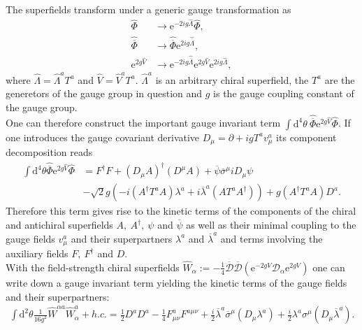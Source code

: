 The superfields transform under a generic gauge transformation as
\begin{align}
\hat{\Phi} &\to \mathrm{e}^{-2ig\hat{\Lambda}}\hat{\Phi},\nonumber\\
\hat{\overline{\Phi}} &\to \hat{\overline{\Phi}}\mathrm{e}^{2ig\hat{\overline{\Lambda}}},\nonumber\\
\mathrm{e}^{2g\hat{V}} &\to \mathrm{e}^{-2ig\hat{\overline{\Lambda}}}\mathrm{e}^{2g\hat{V}} \mathrm{e}^{2ig\hat{\Lambda}},
\end{align}
where $\hat{\Lambda} = \hat{\Lambda}^aT^a$ and $\hat{V} = \hat{V}^aT^a$. $\hat{\Lambda}^a$ is an arbitrary chiral superfield, the $T^a$ are the generetors of the gauge group in question and $g$ is the gauge coupling constant of the gauge group.\\
One can therefore construct the important gauge invariant term $\int\mathrm{d}^4\theta\ \hat{\overline{\Phi}}\mathrm{e}^{2g\hat{V}}\hat{\Phi}$. If one introduces the gauge covariant derivative $D_\mu = \partial + ig T^a v^a_\mu$ its component decomposition reads
\begin{align}
\int\mathrm{d}^4\theta\hat{\overline{\Phi}}\mathrm{e}^{2g\hat{V}}\hat{\Phi} &= F^\dagger F + \left(D_\mu A\right)^\dagger \left(D^\mu A\right) + \overline{\psi}\overline{\sigma}^\mu i D_\mu \psi\nonumber \\
&- \sqrt{2}g\left( -i(A^\dagger T^aA)\lambda^a +i\overline{\lambda}^a(AT^aA^\dagger) \right) + g(A^\dagger T^a A) D^a .\label{eq:L_matter}
\end{align}
Therefore this term gives rise to the kinetic terms of the components of the chiral and antichiral superfields $A,\ A^\dagger,\ \psi$ and $\overline{\psi}$ as well as their minimal coupling to the gauge fields $v_\mu^a$ and their superpartners $\lambda^a$ and $\overline{\lambda}^a$ and terms involving the auxiliary fields $F,\ F^\dagger$ and $D$.\\
With the field-strength chiral superfields $\hat{W}_\alpha := -\frac{1}{4}\overline{\mathcal{D}}\overline{\mathcal{D}}(\mathrm{e}^{-2gV}\mathcal{D}_\alpha\mathrm{e}^{2gV})$ one can write down a gauge invariant term yielding the kinetic terms of the gauge fields and their superpartners:
\begin{align}
\int\mathrm{d}^2\theta \frac{1}{16g^2 }\hat{W}^{\alpha a} \hat{W}^a_\alpha + h.c.= \frac{1}{2}D^aD^a -\frac{1}{4}F^a_{\mu\nu}F^{a\mu\nu} + \frac{i}{2}\overline{\lambda}^a\overline{\sigma}^\mu(D_\mu\lambda^a) + \frac{i}{2}\lambda^a\sigma^\mu(D_\mu\overline{\lambda}^a).\label{eq:L_gauge}
\end{align}

